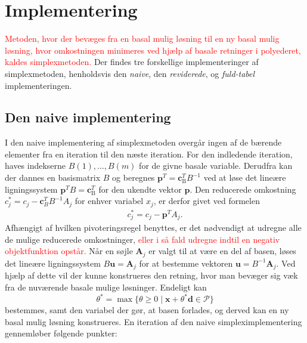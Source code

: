 %
\section{Implementering}
\label{julieergudesmuk}
\textcolor{red}{Metoden, hvor der bevæges fra en basal mulig løsning til en ny basal mulig løsning, hvor omkostningen minimeres ved hjælp af basale retninger i polyederet, kaldes simplexmetoden.}
Der findes tre forskellige implementeringer af simplexmetoden, henholdsvis den \textit{naive}, den \textit{reviderede}, og \textit{fuld-tabel} implementeringen.
%
\subsection{Den naive implementering}
I den naive implementering af simplexmetoden overgår ingen af de bærende elementer fra en iteration til den næste iteration. 
For den indledende iteration, haves indekserne
$B(1),\ldots,B(m)$ for de givne basale variable. 
Derudfra kan der dannes en basismatrix $B$ og beregnes $\mathbf{p}^T=\mathbf{c}_{\text{B}}^T B^{-1}$ ved at løse det lineære ligningssystem $\mathbf{p}^T B=\mathbf{c}_{\text{B}}^T$ for den ukendte vektor $\mathbf{p}$.
Den reducerede omkostning $c_j^* = c_j - \mathbf{c}_B^T B^{-1}A_j$ for enhver variabel $x_j$, er derfor givet ved formelen
%
\begin{align*}
c_j^* = c_j - \mathbf{p}^T A_j.
\end{align*}
%
Afhængigt af hvilken pivoteringsregel benyttes, er det nødvendigt at udregne alle de mulige reducerede omkostninger, \textcolor{red}{eller i så fald udregne indtil en negativ objektfunktion opstår.}
Når en søjle $\mathbf{A}_j$ er valgt til at være en del af basen, løses det lineære ligningssystem $B\mathbf{u}=\mathbf{A}_j$ for at bestemme vektoren $\mathbf{u}=B^{-1}\mathbf{A}_j$.
Ved hjælp af dette vil der kunne konstrueres den retning, hvor man bevæger sig væk fra de nuværende basale mulige løsninger.
Endeligt kan $$\theta^* = \max \{ \theta \geq 0 \mid \textbf{x} + \theta^*\textbf{d} \in \mathcal{P} \}$$ bestemmes, samt den variabel der gør, at basen forlades, og derved kan en ny basal mulig løsning konstrueres. 
En iteration af den naive simpleximplementering gennemløber følgende punkter: 
%

